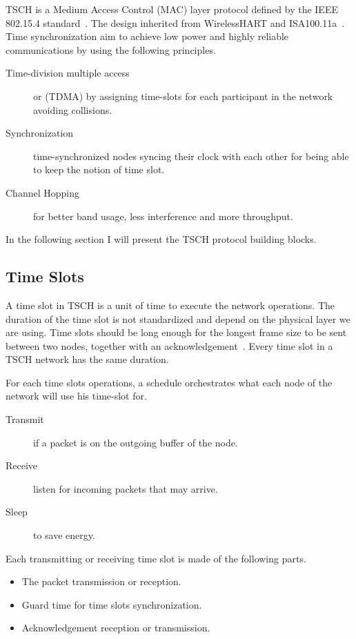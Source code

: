 TSCH is a Medium Access Control (MAC) layer protocol defined by the IEEE
802.15.4 standard~\cite{rfc7554}.
The design inherited from WirelessHART and
ISA100.11a~\cite{Duquennoy2017TSCHA6}.
Time synchronization aim to achieve low power and highly reliable
communications by using the following principles.

\begin{description}
  \item[Time-division multiple access] or (TDMA) by assigning time-slots for each
    participant in the network avoiding collisions.
  \item[Synchronization] time-synchronized nodes syncing their clock with each
    other for being able to keep the notion of time slot.
  \item[Channel Hopping] for better band usage, less interference and more
    throughput.
\end{description}

In the following section I will present the TSCH protocol building blocks.

\subsection{Time Slots}

A time slot in TSCH is a unit of time to execute the network operations. 
The duration of the time slot is not standardized and depend on the physical 
layer we are using. 
Time slots should be long enough for the longest frame size to be sent
between two nodes, together with an acknowledgement~\cite{rfc7554}. 
Every time slot in a TSCH network has the same duration.

For each time slots operations, a schedule orchestrates what each
node of the network will use his time-slot for.

\begin{description}
  \item [Transmit] if a packet is on the outgoing buffer of the node.
  \item [Receive] listen for incoming packets that may arrive.
  \item [Sleep] to save energy.
\end{description}

Each transmitting or receiving time slot is made of the following parts.

\begin{itemize}
  \item The packet transmission or reception.
  \item Guard time for time slots synchronization.
  \item Acknowledgement reception or transmission.
\end{itemize}

